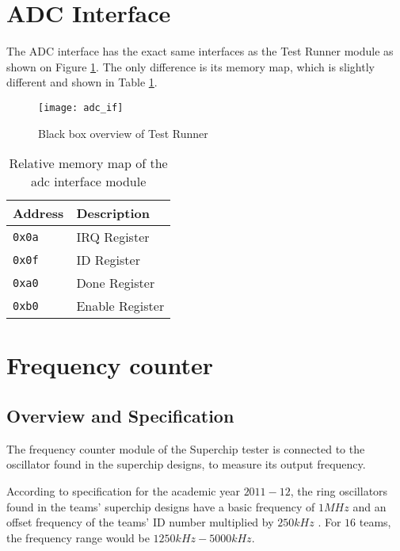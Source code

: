 \newpage
\section{ADC Interface}
The ADC interface has the exact same interfaces as the Test Runner module as shown
on Figure \ref{figure:adc_if_blackbox}. The only difference is its memory map, which is slightly different
and shown in Table \ref{table:adc_memorymap}.

\begin{figure}[h!]
\begin{center}
\texttt{[image: adc\_if]}
\caption{Black box overview of Test Runner}
\label{figure:adc_if_blackbox}
\end{center}
\end{figure}

\begin{table}[h!]
\centering
\begin{tabular}{ | l | l | }
 \hline
   Address       & Description \\
 \hline
   \texttt{0x0a} & IRQ Register \\
 \hline
   \texttt{0x0f} & ID Register \\
 \hline
   \texttt{0xa0} & Done Register \\
 \hline
   \texttt{0xb0} & Enable Register \\
 \hline
\end{tabular}
\caption{Relative memory map of the adc interface module}
\label{table:adc_memorymap}
\end{table}


\newpage
\section{Frequency counter}

\subsection{Overview and Specification}

The frequency counter module of the Superchip tester is connected to the oscillator found in the superchip designs, to measure its output frequency.

According to specification for the academic year $2011-12$, the ring oscillators found in the teams' superchip designs have a basic frequency of $1MHz$ and an offset frequency of the teams' ID number multiplied by $250kHz$ \citep{Southampton:2011:spec}. For $16$ teams, the frequency range would be $1250kHz - 5000kHz$.

